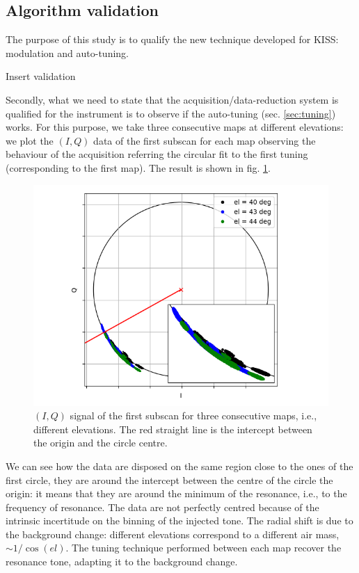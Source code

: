 \documentclass[twocolumn,traditabstract]{aa}\\
\begin{document}
\subsection{Algorithm validation}
The purpose of this study is to qualify the new technique developed for KISS: modulation and auto-tuning.

Insert validation

Secondly, what we need to state that the acquisition/data-reduction system is qualified for the instrument is to observe if the auto-tuning (sec. \ref{sec:tuning}) works. For this purpose, we take three consecutive maps at different elevations: we plot the $(I,Q)$ data of the first subscan for each map observing the behaviour of the acquisition referring the circular fit to the first tuning (corresponding to the first map). The result is shown in fig. \ref{fig:autotuning}.

\begin{figure}[htf]
	\centering
	\includegraphics[width=.5\textwidth]{4.results/autotuning.png}
	\caption{$(I,Q)$ signal of the first subscan for three consecutive maps, i.e., different elevations. The red straight line is the intercept between the origin and the circle centre.}
	\label{fig:autotuning}
\end{figure}

\noindent We can see how the data are disposed on the same region close to the ones of the first circle, they are around the intercept between the centre of the circle the origin: it means that they are around the minimum of the resonance, i.e., to the frequency of resonance. The data are not perfectly centred because of the intrinsic incertitude on the binning of the injected tone. The radial shift is due to the background change: different elevations correspond to a different air mass, $\sim 1/\cos(el)$. The tuning technique performed between each map recover the resonance  tone, adapting it to the background change.
\end{document}
